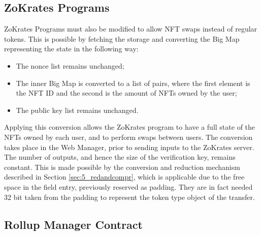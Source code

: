 \subsection{ZoKrates Programs}

ZoKrates Programs must also be modified to allow NFT swaps instead of regular tokens. This is possible by fetching the storage and converting the Big Map representing the state in the following way:
\begin{itemize}
	\item The nonce list remains unchanged;
	\item The inner Big Map is converted to a list of pairs, where the first element is the NFT ID and the second is the amount of NFTs owned by the user;
	\item The public key list remains unchanged.
\end{itemize}

Applying this conversion allows the ZoKrates program to have a full state of the NFTs owned by each user, and to perform swaps between users. The conversion takes place in the Web Manager, prior to sending inputs to the ZoKrates server. The number of outputs, and hence the size of the verification key, remains constant. This is made possible by the conversion and reduction mechanism described in Section \ref{sec:5_redandcompr}, which is applicable due to the free space in the field entry, previously reserved as padding. They are in fact needed 32 bit taken from the padding to represent the token type object of the transfer.

\subsection{Rollup Manager Contract}

